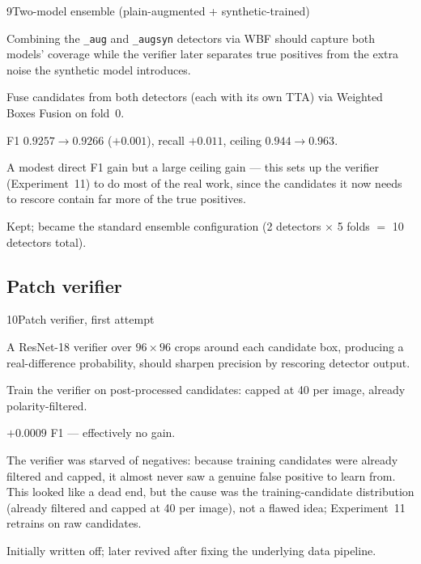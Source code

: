 \begin{explog}{9}{Two-model ensemble (plain-augmented + synthetic-trained)}
\item[Hypothesis] Combining the \texttt{\_aug} and \texttt{\_augsyn} detectors via WBF should capture both models' coverage while the verifier later separates true positives from the extra noise the synthetic model introduces.
\item[Method] Fuse candidates from both detectors (each with its own TTA) via Weighted Boxes Fusion on fold~0.
\item[Result] F1 $0.9257 \rightarrow 0.9266$ ($+0.001$), recall $+0.011$, ceiling $0.944 \rightarrow 0.963$.
\item[Inference] A modest direct F1 gain but a large ceiling gain --- this sets up the verifier (Experiment~11) to do most of the real work, since the candidates it now needs to rescore contain far more of the true positives.
\item[Verdict] Kept; became the standard ensemble configuration (2 detectors $\times$ 5 folds $=$ 10 detectors total).
\end{explog}


\subsection{Patch verifier}

\begin{explog}{10}{Patch verifier, first attempt}
\item[Hypothesis] A ResNet-18 verifier over $96\times96$ crops around each candidate box, producing a real-difference probability, should sharpen precision by rescoring detector output.
\item[Method] Train the verifier on post-processed candidates: capped at 40 per image, already polarity-filtered.
\item[Result] $+0.0009$ F1 --- effectively no gain.
\item[Inference] The verifier was starved of negatives: because training candidates were already filtered and capped, it almost never saw a genuine false positive to learn from. This looked like a dead end, but the cause was the training-candidate distribution (already filtered and capped at 40 per image), not a flawed idea; Experiment~11 retrains on raw candidates.
\item[Verdict] Initially written off; later revived after fixing the underlying data pipeline.
\end{explog}


